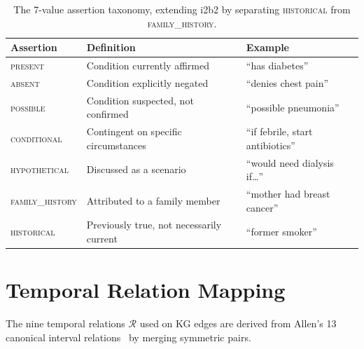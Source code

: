 \begin{table}[ht]
\centering
\small
\begin{tabular}{lp{6.5cm}l}
\toprule
\textbf{Assertion} & \textbf{Definition} & \textbf{Example} \\
\midrule
\textsc{present} & Condition currently affirmed & ``has diabetes'' \\
\textsc{absent} & Condition explicitly negated & ``denies chest pain'' \\
\textsc{possible} & Condition suspected, not confirmed & ``possible pneumonia'' \\
\textsc{conditional} & Contingent on specific circumstances & ``if febrile, start antibiotics'' \\
\textsc{hypothetical} & Discussed as a scenario & ``would need dialysis if\ldots'' \\
\textsc{family\_history} & Attributed to a family member & ``mother had breast cancer'' \\
\textsc{historical} & Previously true, not necessarily current & ``former smoker'' \\
\bottomrule
\end{tabular}
\caption{The 7-value assertion taxonomy, extending i2b2 by separating \textsc{historical} from \textsc{family\_history}.}
\label{tab:assertion_defs}
\end{table}


\section{Temporal Relation Mapping}
\label{app:temporal}

The nine temporal relations $\mathcal{R}$ used on KG edges are derived from Allen's 13 canonical interval relations~\cite{allen1983temporal} by merging symmetric pairs.

